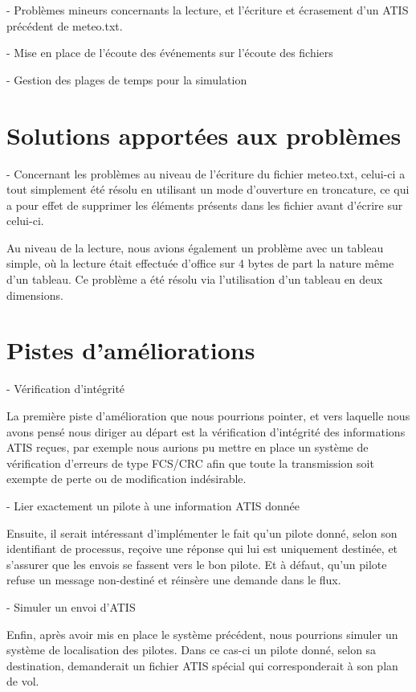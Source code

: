 \documentclass{report}
\begin{document}
{		- Problèmes mineurs concernants la lecture, et l'écriture et écrasement d'un ATIS précédent de meteo.txt.

		- Mise en place de l'écoute des événements sur l'écoute des fichiers

		- Gestion des plages de temps pour la simulation


	\section{Solutions apportées aux problèmes}

		- Concernant les problèmes au niveau de l'écriture du fichier meteo.txt, celui-ci a tout simplement été résolu en utilisant un mode d'ouverture en troncature, ce qui a pour effet de supprimer les éléments présents dans les fichier avant d'écrire sur celui-ci.

		Au niveau de la lecture, nous avions également un problème avec un tableau simple, où la lecture était effectuée d'office sur 4 bytes de part la nature même d'un tableau. Ce problème a été résolu via l'utilisation d'un tableau en deux dimensions.

	\section{Pistes d'améliorations}

		- Vérification d'intégrité

		La première piste d'amélioration que nous pourrions pointer, et vers laquelle nous avons pensé nous diriger au départ est la vérification d'intégrité des informations ATIS reçues, par exemple nous aurions pu mettre en place un système de vérification d'erreurs de type FCS/CRC afin que toute la transmission soit exempte de perte ou de modification indésirable.
		
		- Lier exactement un pilote à une information ATIS donnée

		Ensuite, il serait intéressant d'implémenter le fait qu'un pilote donné, selon son identifiant de processus, reçoive une réponse qui lui est uniquement destinée, et s'assurer que les envois se fassent vers le bon pilote. Et à défaut, qu'un pilote refuse un message non-destiné et réinsère une demande dans le flux.

		- Simuler un envoi d'ATIS 

		Enfin, après avoir mis en place le système précédent, nous pourrions simuler un système de localisation des pilotes.
		Dans ce cas-ci un pilote donné, selon sa destination, demanderait un fichier ATIS spécial qui corresponderait à son plan de vol.

}
\end{document}
